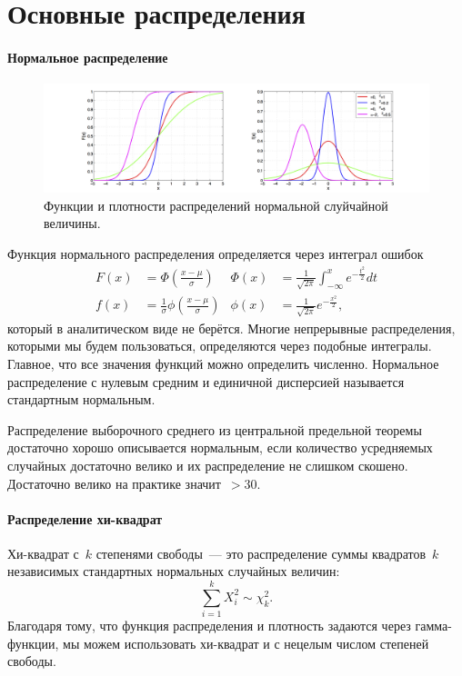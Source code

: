 \section{Основные распределения}
\paragraph{Нормальное распределение}
\begin{figure}[!htb]\center
 \includegraphics[width=\textwidth]{lectures/lect1/src/norm.png}
\caption{Функции и плотности распределений нормальной слуйчайной величины.}
\label{fg:lect1:fig-3}
\end{figure}
Функция нормального распределения определяется через интеграл ошибок
\begin{align*}
     F\left(x\right) &= \Phi\left(\frac{x-\mu}{\sigma}\right)                &\Phi\left(x\right) &= \frac1{\sqrt{2\pi}} \int_{-\infty}^x e^{-\frac{t^2}{2}} dt\\
     f\left(x\right) &= \frac1{\sigma}\phi\left(\frac{x-\mu}{\sigma}\right)  &\phi\left(x\right) &= \frac1{\sqrt{2\pi}} e^{-\frac{x^2}{2}},
\end{align*}
который в аналитическом виде не берётся. Многие непрерывные распределения, которыми мы будем пользоваться, определяются через подобные интегралы. Главное, что все значения функций можно определить численно. Нормальное распределение с нулевым средним и единичной дисперсией называется стандартным нормальным. 

Распределение выборочного среднего из центральной предельной теоремы достаточно хорошо описывается нормальным, если количество усредняемых случайных достаточно велико и их распределение не слишком скошено. Достаточно велико на практике значит~$>30$.

\paragraph{Распределение хи-квадрат}
Хи-квадрат с~$k$ степенями свободы~--- это распределение суммы квадратов~$k$ независимых стандартных нормальных случайных величин:
\[
    \sum\limits_{i=1}^k X_i^2 \sim \chi^2_k.
\]
Благодаря тому, что функция распределения и плотность задаются через гамма-функции, мы можем использовать хи-квадрат и с нецелым числом степеней свободы.


